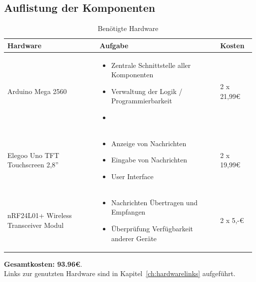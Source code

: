 \documentclass[a4paper, 11pt]{scrartcl}
\begin{document}
\subsection{Auflistung der Komponenten}
\begin{small}

\begin{table}[H]
    \caption{Benötigte Hardware}\label{tab:hardware}
    \begin{tabular}{|p{}|p{}|p{}|}
        \hline
        \textbf{Hardware} & \textbf{Aufgabe} & \textbf{Kosten}
        \\
        \hline\hline
        Arduino Mega 2560 
        & 
        \begin{itemize}
            \item Zentrale Schnittstelle aller Komponenten
            \item Verwaltung der Logik / Programmierbarkeit
            \item 
        \end{itemize} 
        & 
        2 x 21,99€
        \\
        \hline
        Elegoo Uno TFT Touchscreen 2,8''
        &
        \begin{itemize}
            \item Anzeige von Nachrichten
            \item Eingabe von Nachrichten
            \item User Interface
        \end{itemize}
        &
        2 x 19,99€
        \\
        \hline
        nRF24L01+ Wireless Transceiver Modul
        &
        \begin{itemize}
            \item Nachrichten Übertragen und Empfangen
            \item Überprüfung Verfügbarkeit anderer Geräte
        \end{itemize}
        &
        2 x 5,-€
        \\
        \hline
    \end{tabular}
\end{table}
\textbf{Gesamtkosten: 93.96€}. 
\\
Links zur genutzten Hardware sind in Kapitel~\ref{ch:hardwarelinks} aufgeführt.


\end{small}
\end{document}
